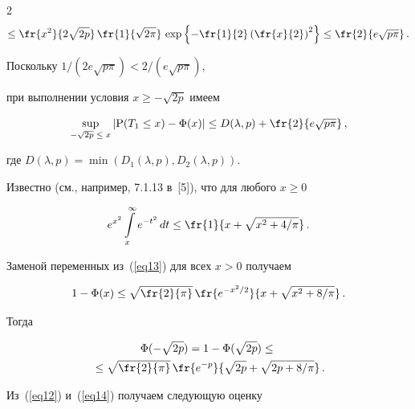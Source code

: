 \begin{multicols}{2}
\begin{multline*}
\leq \fr{x^2}{2\sqrt{2p}}\, \fr{1}{\sqrt{2\pi}}\,

\exp \left\{-\fr{1}{2} \left( \fr{x}{2}\right )^2\right\}

 \leq \fr{2}{ e\sqrt{p \pi}}\,.

\end{multline*}

Поскольку $1/(2 e \sqrt{p \pi})< 2 /(e\sqrt{p \pi})$,

 при выполнении условия  $x \ge - \sqrt{2p}$ имеем

\begin{equation}

\sup\limits_{-\sqrt{2p} \;\le\; x} |\P(T_1 \le x) - \IP(x)|

  \leq D(\lambda,p) + \fr{2}{e \sqrt{p \pi}}\,, 

  \label{eq12}

\end{equation}

где $D(\lambda,p) = \min\left(D_1(\lambda,p), D_2(\lambda,p)\right)$.



Известно (см., например, 7.1.13 в~[5]), что для любого     $x \ge 0$

\begin{equation}

 e^{x^2} \int\limits^{\infty}_{x} e^{- t^2} \,dt \leq \fr{1}{x + \sqrt{x^2 + 4/\pi}}\,. 

 \label{eq13}

\end{equation}

Заменой переменных из~(\ref{eq13})  для всех $x > 0$ получаем

$$

   1 -\IP(x) \leq  \sqrt{\fr{2}{\pi}}\, \fr{e^{-x^2/2}}{x + \sqrt{x^2 + 8/\pi}}\,.

$$

Тогда

\begin{multline}

\IP(-\sqrt{2p})  = 1 - \IP(\sqrt{2p})\leq{}\\

{} \leq \sqrt{\fr{2}{\pi}}\, \fr{e^{-p}}{\sqrt{2p} + \sqrt{2p + 8/\pi}}\,.

 \label{eq14}

\end{multline}

 Из~(\ref{eq12}) и~(\ref{eq14})  получаем следующую оценку

\begin{multline*}


\end{multline*}
\end{multicols}
